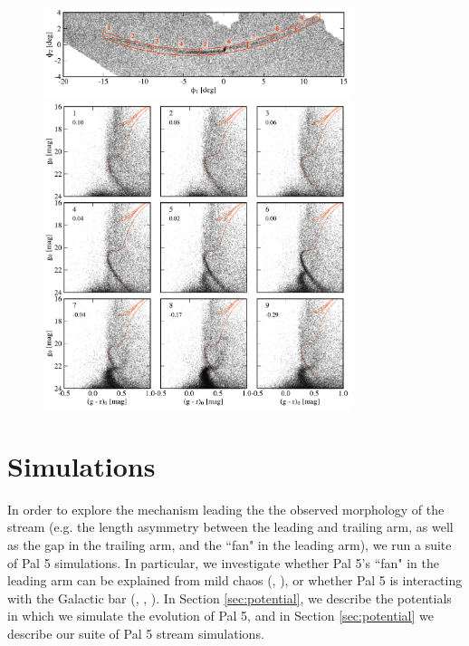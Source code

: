 \documentclass[modern]{aastex62}
\begin{document}
\begin{figure}
\begin{center}
\includegraphics[width=0.8\textwidth]{fig1_a_map.pdf}
\includegraphics[width=0.8\textwidth]{fig1_b_cmds.pdf}
\end{center}
\caption{
}
\label{fig:cmds}
\end{figure}

\section{Simulations}
\label{sec:sim}
In order to explore the mechanism leading the the observed morphology of the stream (e.g. the length asymmetry between the leading and trailing arm, as well as the gap in the trailing arm, and the ``fan" in the leading arm), we run a suite of Pal 5 simulations. In particular, we investigate whether Pal 5's ``fan" in the leading arm can be explained from mild chaos  (\citealt{Pearson:2015}, \citealt{Price-Whelan:2016}), or whether Pal 5 is interacting with the Galactic bar (\citealt{Pearson:2017}, \citealt{Erkal:2017}, \citealt{Banik:2019}). In Section \ref{sec:potential}, we describe the potentials in which we simulate the evolution of Pal 5, and in Section \ref{sec:potential} we describe our suite of Pal 5 stream simulations. 
\end{document}
